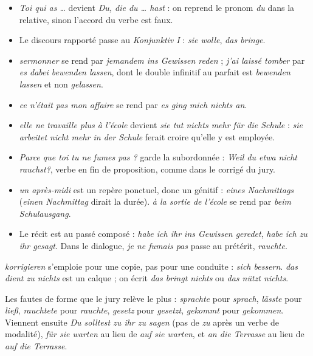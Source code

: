 \documentclass[11pt,a4paper]{article}
\providecommand{\tightlist}{\setlength{\itemsep}{0pt}\setlength{\parskip}{0pt}}
\begin{document}
\begin{itemize}
\tightlist
\item
  \emph{Toi qui as \ldots{}} devient \emph{Du, die du \ldots{} hast} : on reprend le pronom \emph{du} dans la relative, sinon l'accord du verbe est faux.
\item
  Le discours rapporté passe au \emph{Konjunktiv I} : \emph{sie wolle}, \emph{das bringe}.
\item
  \emph{sermonner} se rend par \emph{jemandem ins Gewissen reden} ; \emph{j'ai laissé tomber} par \emph{es dabei bewenden lassen}, dont le double infinitif au parfait est \emph{bewenden lassen} et non \emph{gelassen}.
\item
  \emph{ce n'était pas mon affaire} se rend par \emph{es ging mich nichts an}.
\item
  \emph{elle ne travaille plus à l'école} devient \emph{sie tut nichts mehr für die Schule} : \emph{sie arbeitet nicht mehr in der Schule} ferait croire qu'elle y est employée.
\item
  \emph{Parce que toi tu ne fumes pas ?} garde la subordonnée : \emph{Weil du etwa nicht rauchst?}, verbe en fin de proposition, comme dans le corrigé du jury.
\item
  \emph{un après-midi} est un repère ponctuel, donc un génitif : \emph{eines Nachmittags} (\emph{einen Nachmittag} dirait la durée). \emph{à la sortie de l'école} se rend par \emph{beim Schulausgang}.
\item
  Le récit est au passé composé : \emph{habe ich ihr ins Gewissen geredet}, \emph{habe ich zu ihr gesagt}. Dans le dialogue, \emph{je ne fumais pas} passe au prétérit, \emph{rauchte}.
\end{itemize}

\begin{piege}

\emph{korrigieren} s'emploie pour une copie, pas pour une conduite : \emph{sich bessern}. \emph{das dient zu nichts} est un calque ; on écrit \emph{das bringt nichts} ou \emph{das nützt nichts}.

\end{piege}

\begin{piege}

Les fautes de forme que le jury relève le plus : \emph{sprachte} pour \emph{sprach}, \emph{lässte} pour \emph{ließ}, \emph{rauchtete} pour \emph{rauchte}, \emph{gesetz} pour \emph{gesetzt}, \emph{gekommt} pour \emph{gekommen}. Viennent ensuite \emph{Du solltest zu ihr zu sagen} (pas de \emph{zu} après un verbe de modalité), \emph{für sie warten} au lieu de \emph{auf sie warten}, et \emph{an die Terrasse} au lieu de \emph{auf die Terrasse}.

\end{piege}
\end{document}
